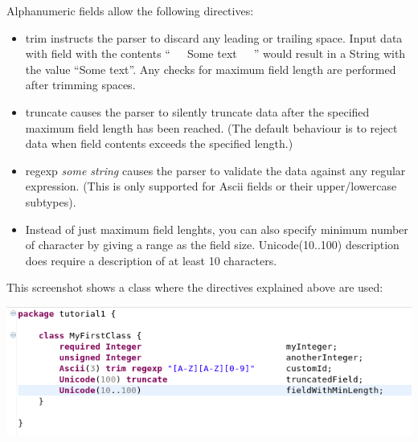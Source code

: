 \documentclass[11pt,a4paper,oneside]{article}
\begin{document}
Alphanumeric fields allow the following directives:
\begin{itemize}
  \item {\ttfamily trim} instructs the parser to discard any leading or trailing space. Input data with field with the contents ``\ \ \ Some text\ \ \  '' would result in a String with the
  value ``Some text''. Any checks for maximum field length are performed after trimming spaces.
  \item {\ttfamily truncate} causes the parser to silently truncate data after the specified maximum field length has been reached.
   (The default behaviour is to reject data when field contents exceeds the specified length.) 
   \item {\ttfamily regexp} {\it{some string}} causes the parser to validate the data against any regular expression. (This is only supported for
     {\ttfamily Ascii} fields or their upper/lowercase subtypes).
   \item Instead of just maximum field lenghts, you can also specify minimum number of character by giving a range as the field size.
    {\ttfamily Unicode(10..100) description} does require a description of at least 10 characters. 
\end{itemize}

This screenshot shows a class where the directives explained above are used:

\vspace{2mm}

\hspace{1cm}\includegraphics[scale=0.5]{images/tut1-005.png}
\end{document}
